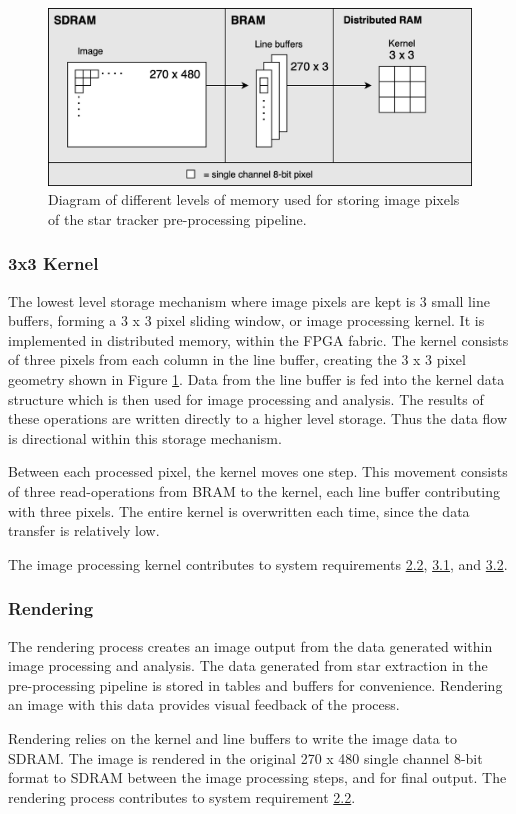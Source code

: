\documentclass[12pt]{report}
\begin{document}
\begin{figure}[h]
    \centering
    \includegraphics[scale=0.3]{figures/mem_overview.png}
    \caption{Diagram of different levels of memory used for storing image pixels of the star tracker pre-processing pipeline.}
    \label{fig:mem_overview}
\end{figure}

\subsubsection{3x3 Kernel}
The lowest level storage mechanism where image pixels are kept is 3 small line buffers, forming a 3 x 3 pixel sliding window, or image processing kernel. It is implemented in distributed memory, within the FPGA fabric. The kernel consists of three pixels from each column in the line buffer, creating the 3 x 3 pixel geometry shown in Figure \ref*{fig:mem_overview}. Data from the line buffer is fed into the kernel data structure which is then used for image processing and analysis. The results of these operations are written directly to a higher level storage. Thus the data flow is directional within this storage mechanism. \citep{stpp}
\par
Between each processed pixel, the kernel moves one step. This movement consists of three read-operations from BRAM to the kernel, each line buffer contributing with three pixels. The entire kernel is overwritten each time, since the data transfer is relatively low. \citep{stpp}
\par
The image processing kernel contributes to system requirements \hyperref[req2.2]{2.2}, \hyperref[req3.1]{3.1}, and \hyperref[req3.2]{3.2}.

\subsubsection{Rendering}
The rendering process creates an image output from the data generated within image processing and analysis. The data generated from star extraction in the pre-processing pipeline is stored in tables and buffers for convenience. Rendering an image with this data provides visual feedback of the process.
\par
Rendering relies on the kernel and line buffers to write the image data to SDRAM. The image is rendered in the original 270 x 480 single channel 8-bit format to SDRAM between the image processing steps, and for final output. The rendering process contributes to system requirement \hyperref[req2.2]{2.2}. \citep{stpp}
\end{document}
